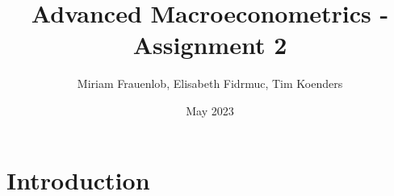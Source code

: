 \documentclass{article}
\title{Advanced Macroeconometrics - Assignment 2}
\author{Miriam Frauenlob, Elisabeth Fidrmuc, Tim Koenders }
\date{May 2023}
\begin{document}
\maketitle

\section{Introduction}
\end{document}
